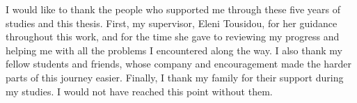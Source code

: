
\begin{acknowledgements}
I would like to thank the people who supported me through these five years of studies and this thesis. First, my supervisor, Eleni Tousidou, for her guidance throughout this work, and for the time she gave to reviewing my progress and helping me with all the problems I encountered along the way. I also thank my fellow students and friends, whose company and encouragement made the harder parts of this journey easier. Finally, I thank my family for their support during my studies. I would not have reached this point without them.
\end{acknowledgements}